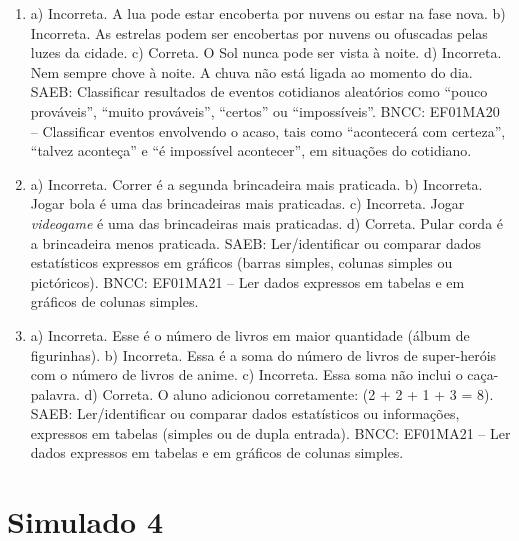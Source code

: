 \begin{enumerate}
\item
a) Incorreta. A lua pode estar encoberta por nuvens ou estar na fase nova.
b) Incorreta. As estrelas podem ser encobertas por nuvens ou ofuscadas pelas luzes da cidade.
c) Correta. O Sol nunca pode ser vista à noite.
d) Incorreta. Nem sempre chove à noite. A chuva não está ligada ao
momento do dia.
SAEB: Classificar resultados de eventos cotidianos aleatórios como
``pouco prováveis'', ``muito prováveis'', ``certos'' ou ``impossíveis''.
BNCC: EF01MA20 -- Classificar eventos envolvendo o acaso, tais como
``acontecerá com certeza'', ``talvez aconteça'' e ``é impossível
acontecer'', em situações do cotidiano.

\item
a) Incorreta. Correr é a segunda brincadeira mais praticada.
b) Incorreta. Jogar bola é uma das brincadeiras mais praticadas.
c) Incorreta. Jogar \textit{videogame} é uma das brincadeiras mais praticadas.
d) Correta. Pular corda é a brincadeira menos praticada.
SAEB: Ler/identificar ou comparar dados estatísticos expressos
em gráficos (barras simples, colunas simples ou pictóricos).
BNCC: EF01MA21 -- Ler dados expressos em tabelas e em gráficos de colunas
simples.

\item
a) Incorreta. Esse é o número de livros em maior quantidade (álbum de figurinhas).
b) Incorreta. Essa é a soma do número de livros de super-heróis com o número de livros de anime.
c) Incorreta. Essa soma não inclui o caça-palavra.
d) Correta. O aluno adicionou corretamente: (2 + 2 + 1 + 3 = 8).
SAEB: Ler/identificar ou comparar dados estatísticos ou
informações, expressos em tabelas (simples ou de dupla entrada).
BNCC: EF01MA21 -- Ler dados expressos em tabelas e em gráficos de colunas
simples.
\end{enumerate}

\section*{Simulado 4}

